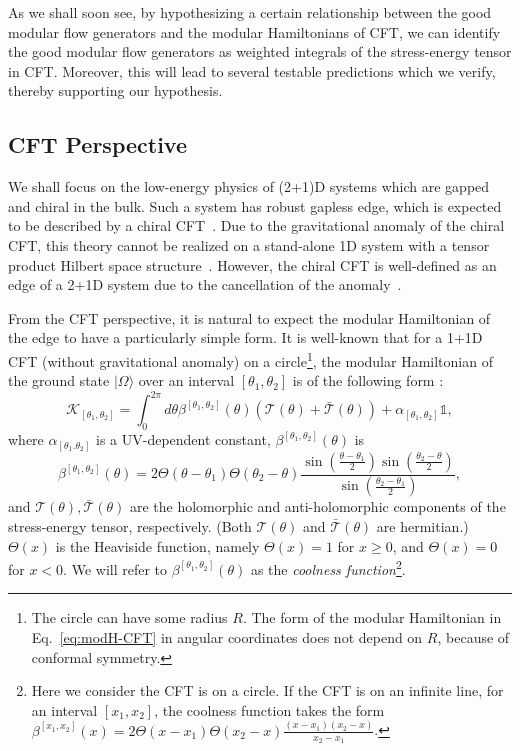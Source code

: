 \documentclass[12pt, nofootinbib]{article}
\theoremstyle{plain}
\theoremstyle{assumption}
\theoremstyle{definition}
\theoremstyle{plain}
\theoremstyle{plain}
\theoremstyle{plain}
\theoremstyle{plain}
\theoremstyle{plain}
\def\Kcft{\mathscr{K}}
\def\Tcft{\mathscr{T}}
\def\({\left(}
\def\){\right)}
\begin{document}
As we shall soon see, by hypothesizing a certain relationship between the good modular flow generators and the modular Hamiltonians of CFT, we can identify the good modular flow generators as weighted integrals of the stress-energy tensor in CFT. Moreover, this will lead to several testable predictions which we verify, thereby supporting our hypothesis.


 
\subsection{CFT Perspective}
We shall focus on the low-energy physics of (2+1)D systems which are gapped and chiral in the bulk. Such a system has robust gapless edge, which is expected to be described by a chiral CFT~\cite{Halperin1982,Witten:1988hf,Wen1991}.
Due to the gravitational anomaly of the chiral CFT, this theory cannot be realized on a stand-alone 1D system with a tensor product Hilbert space structure~\cite{Witten:1988hf,Hellerman:2021fla}. However, the chiral CFT is well-defined as an edge of a 2+1D system due to the cancellation of the anomaly~\cite{Callan:1984sa,Witten:1988hf}. 

From the CFT perspective, it is natural to expect the modular Hamiltonian of the edge to have a particularly simple form. It is well-known that for a 1+1D CFT (without gravitational anomaly) on a circle\footnote{The circle can have some radius $R$. The form of the modular Hamiltonian in Eq.~\eqref{eq:modH-CFT} in angular coordinates does not depend on $R$, because of conformal symmetry.}, the modular Hamiltonian of the ground state $|\Omega\rangle$ over an interval $[\theta_1, \theta_2]$ is of the following form \cite{Cardy:2016fqc}: 
\begin{equation} \label{eq:modH-CFT}
    \Kcft_{[\theta_1,\theta_2]}  = \int_0^{2\pi}d\theta\beta^{[\theta_1,\theta_2]}(\theta) \(\Tcft(\theta) + \bar{\Tcft}(\theta) \) + \alpha_{[\theta_1,\theta_2]}\mathbb{1},
\end{equation}
where $\alpha_{[\theta_1.\theta_2]}$ is a UV-dependent constant, $\beta^{[\theta_1,\theta_2]}(\theta)$ is 
\begin{equation}\label{eq:coolness-function}
    \beta^{[\theta_1,\theta_2]}(\theta) =  2 \Theta(\theta-\theta_1) \Theta(\theta_2-\theta) \frac{\sin(\frac{\theta-\theta_1}{2}) \sin(\frac{\theta_2-\theta}{2})}{\sin(\frac{\theta_2-\theta_1}{2})} ,
\end{equation}
and $\Tcft(\theta), \bar{\Tcft}(\theta)$ are the holomorphic and anti-holomorphic components of the stress-energy tensor, respectively. (Both $\Tcft(\theta)$ and $\bar{\Tcft}(\theta)$ are hermitian.)
$\Theta(x)$ is the Heaviside function, namely $\Theta(x)=1$ for $x\ge 0$, and $\Theta(x)=0$ for $x<0$.
We will refer to $\beta^{[\theta_1,\theta_2]}(\theta)$ as the \emph{coolness function}\footnote{Here we consider the CFT is on a circle. If the CFT is on an infinite line, for an interval $[x_1,x_2]$, the coolness function takes the form $\beta^{[x_1,x_2]}(x) = 2\Theta(x-x_1)\Theta(x_2-x)\frac{(x-x_1)(x_2-x)}{x_2-x_1}$.}.
\end{document}
